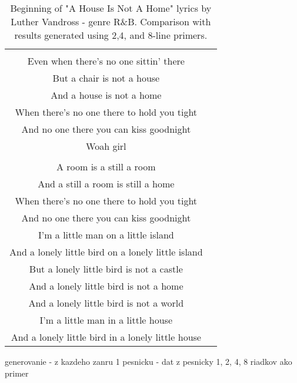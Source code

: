 \begin{table}
\begin{tabular}{cc}
\begin{minipage}[c]{0.47\textwidth}
	 \end{minipage}
	 & 
	 \begin{minipage}[b]{0.47\textwidth}
	 A chair is still a chair\\
	 Even when there's no one sittin' there\\
	 But a chair is not a house\\
	 And a house is not a home\\
	 When there's no one there to hold you tight\\
	 And no one there you can kiss goodnight\\
	 Woah girl\\
	 \\
	 A room is a still a room\\
	 \color{blue} And a still a room is still a home\\
	 When there's no one there to hold you tight\\
	 And no one there you can kiss goodnight\\
	 I'm a little man on a little island\\
	 And a lonely little bird on a lonely little island\\	 
	 But a lonely little bird is not a castle\\
	 And a lonely little bird is not a home\\
	 And a lonely little bird is not a world\\
	 I'm a little man in a little house\\
	 And a lonely little bird in a lonely little house
	 \end{minipage}\\[6pt]
	\end{tabular}
	\caption{Beginning of "A House Is Not A Home" lyrics by Luther Vandross - genre R\&B. Comparison with results generated using 2,4, and 8-line primers.}
\end{table}



 generovanie
-  z kazdeho zanru 1 pesnicku
- dat z pesnicky 1, 2, 4, 8 riadkov ako primer
